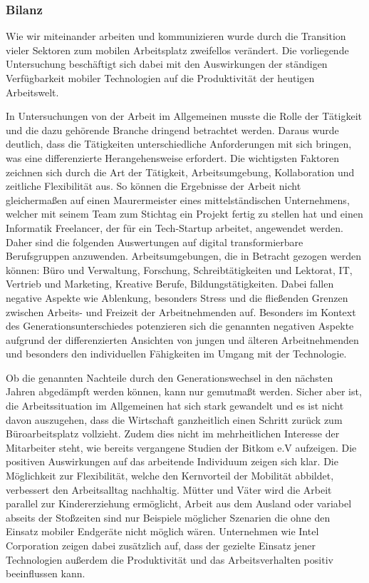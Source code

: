 \documentclass[12pt,a4paper]{article}
\begin{document}
\subsubsection*{Bilanz}
Wie wir miteinander arbeiten und kommunizieren wurde durch die Transition vieler Sektoren zum mobilen Arbeitsplatz zweifellos verändert. Die vorliegende Untersuchung beschäftigt sich dabei mit den Auswirkungen der ständigen Verfügbarkeit mobiler Technologien auf die Produktivität der heutigen Arbeitswelt.  

In Untersuchungen von der Arbeit im Allgemeinen musste die Rolle der Tätigkeit und die dazu gehörende Branche dringend betrachtet werden. Daraus wurde deutlich, dass die Tätigkeiten unterschiedliche Anforderungen mit sich bringen, was eine differenzierte Herangehensweise erfordert. Die wichtigsten Faktoren zeichnen sich durch die Art der Tätigkeit, Arbeitsumgebung, Kollaboration und zeitliche Flexibilität aus. So können die Ergebnisse der Arbeit nicht gleichermaßen auf einen Maurermeister eines mittelständischen Unternehmens, welcher mit seinem Team zum Stichtag ein Projekt fertig zu stellen hat und einen Informatik Freelancer, der für ein Tech-Startup arbeitet, angewendet werden. Daher sind die folgenden Auswertungen auf digital transformierbare Berufsgruppen anzuwenden. Arbeitsumgebungen, die in Betracht gezogen werden können: Büro und Verwaltung, Forschung, Schreibtätigkeiten und Lektorat, IT, Vertrieb und Marketing, Kreative Berufe, Bildungstätigkeiten. Dabei fallen negative Aspekte wie Ablenkung, besonders Stress und die fließenden Grenzen zwischen Arbeits- und Freizeit der Arbeitnehmenden auf. Besonders im Kontext des Generationsunterschiedes potenzieren sich die genannten negativen Aspekte aufgrund der differenzierten Ansichten von jungen und älteren Arbeitnehmenden und besonders den individuellen Fähigkeiten im Umgang mit der Technologie. 

Ob die genannten Nachteile durch den Generationswechsel in den nächsten Jahren abgedämpft werden können, kann nur gemutmaßt werden. Sicher aber ist, die Arbeitssituation im Allgemeinen hat sich stark gewandelt und es ist nicht davon auszugehen, dass die Wirtschaft ganzheitlich einen Schritt zurück zum Büroarbeitsplatz vollzieht. Zudem dies nicht im mehrheitlichen Interesse der Mitarbeiter steht, wie bereits vergangene Studien der Bitkom e.V aufzeigen. Die positiven Auswirkungen auf das arbeitende Individuum zeigen sich klar. Die Möglichkeit zur Flexibilität, welche den Kernvorteil der Mobilität abbildet, verbessert den Arbeitsalltag nachhaltig. Mütter und Väter wird die Arbeit parallel zur Kindererziehung ermöglicht, Arbeit aus dem Ausland oder variabel abseits der Stoßzeiten sind nur Beispiele möglicher Szenarien die ohne den Einsatz mobiler Endgeräte nicht möglich wären. Unternehmen wie Intel Corporation zeigen dabei zusätzlich auf, dass der gezielte Einsatz jener Technologien außerdem die Produktivität und das Arbeitsverhalten positiv beeinflussen kann.  
\end{document}
